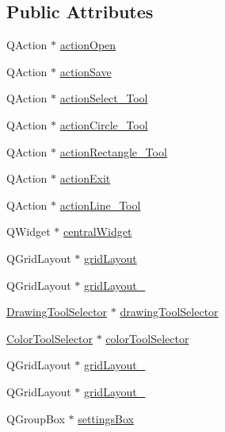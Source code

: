 \subsection*{Public Attributes}
\begin{DoxyCompactItemize}
\item 
Q\+Action $\ast$ \hyperlink{class_ui___main_window_a5772f39001f62b7f601aafe72caa10c0}{action\+Open}
\item 
Q\+Action $\ast$ \hyperlink{class_ui___main_window_a6e14788227f1a0dbc8cf983514685f3b}{action\+Save}
\item 
Q\+Action $\ast$ \hyperlink{class_ui___main_window_a2a918e9479b5de5c6171ee349d1a61f1}{action\+Select\+\_\+\+Tool}
\item 
Q\+Action $\ast$ \hyperlink{class_ui___main_window_adc1809dea2b94018b3fd6fc3efe40775}{action\+Circle\+\_\+\+Tool}
\item 
Q\+Action $\ast$ \hyperlink{class_ui___main_window_ac5febda9ff6ce44e31f0c3c1d889d388}{action\+Rectangle\+\_\+\+Tool}
\item 
Q\+Action $\ast$ \hyperlink{class_ui___main_window_ae8370529640da51b50cd1fb5be677c02}{action\+Exit}
\item 
Q\+Action $\ast$ \hyperlink{class_ui___main_window_a794b1c2e016ee1387008d1c22bec9b43}{action\+Line\+\_\+\+Tool}
\item 
Q\+Widget $\ast$ \hyperlink{class_ui___main_window_a30075506c2116c3ed4ff25e07ae75f81}{central\+Widget}
\item 
Q\+Grid\+Layout $\ast$ \hyperlink{class_ui___main_window_a525ed3c5fe0784ac502ee222fba4e205}{grid\+Layout}
\item 
Q\+Grid\+Layout $\ast$ \hyperlink{class_ui___main_window_af42ea7d4c2e893181caad21e28166932}{grid\+Layout\+\_}
\item 
\hyperlink{class_drawing_tool_selector}{Drawing\+Tool\+Selector} $\ast$ \hyperlink{class_ui___main_window_ac1508256639e4341c10fb2b6ab66a646}{drawing\+Tool\+Selector}
\item 
\hyperlink{class_color_tool_selector}{Color\+Tool\+Selector} $\ast$ \hyperlink{class_ui___main_window_a7ae116c4161d4316369030c6c58d50f8}{color\+Tool\+Selector}
\item 
Q\+Grid\+Layout $\ast$ \hyperlink{class_ui___main_window_a6b2a0c5f7e8ff2a87134908dd770d2d2}{grid\+Layout\+\_}
\item 
Q\+Grid\+Layout $\ast$ \hyperlink{class_ui___main_window_a8ee86315639f324b17708efc7dbe8b19}{grid\+Layout\+\_}
\item 
Q\+Group\+Box $\ast$ \hyperlink{class_ui___main_window_afa8361dafeea9335501efa7f218549a8}{settings\+Box}

\end{DoxyCompactItemize}
